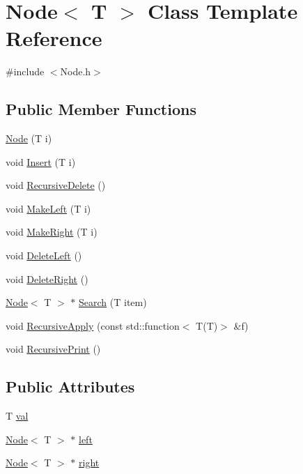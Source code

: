 \hypertarget{class_node}{}\section{Node$<$ T $>$ Class Template Reference}
\label{class_node}


{\ttfamily \#include $<$Node.\+h$>$}

\subsection*{Public Member Functions}
\begin{DoxyCompactItemize}
\item 
\hyperlink{class_node_ab8e10d6e54904902c9640d1d83ccff24}{Node} (T i)
\item 
void \hyperlink{class_node_a262e2966e15df5b2573579f2ce1f557d}{Insert} (T i)
\item 
void \hyperlink{class_node_abb2d4a9141905c8b97e413398372baca}{Recursive\+Delete} ()
\item 
void \hyperlink{class_node_abc249933daa35682fd99b0d8655b7b2b}{Make\+Left} (T i)
\item 
void \hyperlink{class_node_a6262188eda0cd573e05269673d9893ea}{Make\+Right} (T i)
\item 
void \hyperlink{class_node_aa762c6b164590416bf3c47c3967d022d}{Delete\+Left} ()
\item 
void \hyperlink{class_node_a637ef455f068bfb4006ca9da5f91ad8e}{Delete\+Right} ()
\item 
\hyperlink{class_node}{Node}$<$ T $>$ $\ast$ \hyperlink{class_node_aab3421eb041fbd87453dccbce97a30e4}{Search} (T item)
\item 
void \hyperlink{class_node_ab498ab0ff04e5f71b84a23fa4f8587ea}{Recursive\+Apply} (const std\+::function$<$ T(T)$>$ \&f)
\item 
void \hyperlink{class_node_a7ecdd1732f9eedb03e19a3bdc36194a9}{Recursive\+Print} ()
\end{DoxyCompactItemize}
\subsection*{Public Attributes}
\begin{DoxyCompactItemize}
\item 
T \hyperlink{class_node_a63ca7703bf78a4ea3f6a7f32a9f705c8}{val}
\item 
\hyperlink{class_node}{Node}$<$ T $>$ $\ast$ \hyperlink{class_node_a2841886a16c27e72b21885025c00b44b}{left}
\item 
\hyperlink{class_node}{Node}$<$ T $>$ $\ast$ \hyperlink{class_node_ad7092450d89448320103cde1f72da320}{right}
\end{DoxyCompactItemize}


